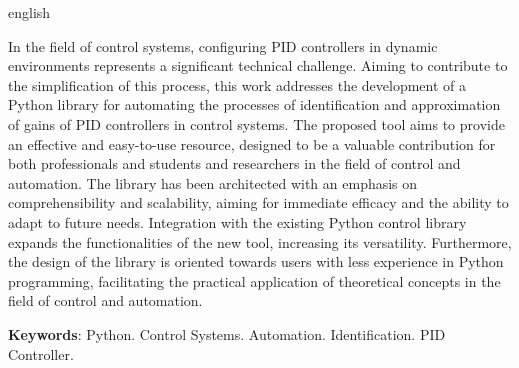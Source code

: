 \documentclass[
	12pt,				%
	openright,			%
	oneside,			%
	a4paper,			%
	english,			%
	french,				%
	spanish,			%
	brazil				%
	]{abntex2}
\begin{document}
\renewcommand{\baselinestretch}{1} 
\begin{resumo}[Abstract]
 \begin{otherlanguage*}{english}

   In the field of control systems, configuring PID controllers in dynamic environments represents a significant
   technical challenge.
   Aiming to contribute to the simplification of this process, this work addresses the development of a Python library
   for automating the processes of identification and approximation of gains of PID controllers in control systems.
   The proposed tool aims to provide an effective and easy-to-use resource, designed to be a valuable contribution for
   both professionals and students and researchers in the field of control and automation.
   The library has been architected with an emphasis on comprehensibility and scalability, aiming for immediate efficacy
   and the ability to adapt to future needs.
   Integration with the existing Python control library expands the functionalities of the new tool, increasing its
   versatility.
   Furthermore, the design of the library is oriented towards users with less experience in Python programming,
   facilitating the practical application of theoretical concepts in the field of control and automation.

 
   \noindent 
   \textbf{Keywords}: Python. Control Systems. Automation. Identification. PID Controller.
 \end{otherlanguage*}
\end{resumo}


\renewcommand{\listfigurename}{Lista de Figuras}
\pdfbookmark[0]{\listfigurename}{lof}
\listoffigures*
\cleardoublepage


\end{document}
